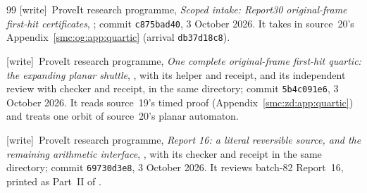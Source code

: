 \documentclass[11pt,letterpaper]{article}
\numberwithin{equation}{section}
\theoremstyle{definition}
\theoremstyle{remark}
\newcommand{\wtag}{\textup{[write]}}
\begin{document}
\begin{thebibliography}{99}
\wtag\ ProveIt research programme, \emph{Scoped intake: Report30 original-frame first-hit certificates}, ; commit \texttt{c875bad40}, 3 October 2026. It takes in source~20's Appendix~\ref{smc:og:app:quartic} (arrival \texttt{db37d18c8}).

\wtag\ ProveIt research programme, \emph{One complete original-frame first-hit quartic: the expanding planar shuttle}, , with its helper and receipt, and its independent review  with checker and receipt, in the same directory; commit \texttt{5b4c091e6}, 3 October 2026. It reads source~19's timed proof (Appendix~\ref{smc:zd:app:quartic}) and treats one orbit of source~20's planar automaton.

\wtag\ ProveIt research programme, \emph{Report 16: a literal reversible source, and the remaining arithmetic interface}, , with its checker and receipt in the same directory; commit \texttt{69730d3e8}, 3 October 2026. It reviews batch-82 Report~16, printed as Part~II of .


\end{thebibliography}
\end{document}

